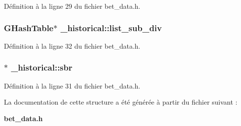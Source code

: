 Définition à la ligne 29 du fichier bet\_\-data.h.

\subsubsection[{list\_\-sub\_\-div}]{\setlength{\rightskip}{0pt plus 5cm}GHashTable$\ast$ {\bf \_\-historical::list\_\-sub\_\-div}}\label{struct__historical_aa7dc0aadedc7245696f8f71067350515}


Définition à la ligne 32 du fichier bet\_\-data.h.

\subsubsection[{sbr}]{$\ast$ {\bf \_\-historical::sbr}}\label{struct__historical_a8dd3440b0f7e42c768836c74f7a8c355}


Définition à la ligne 31 du fichier bet\_\-data.h.



La documentation de cette structure a été générée à partir du fichier suivant :\begin{DoxyCompactItemize}
\item 
{\bf bet\_\-data.h}\end{DoxyCompactItemize}
